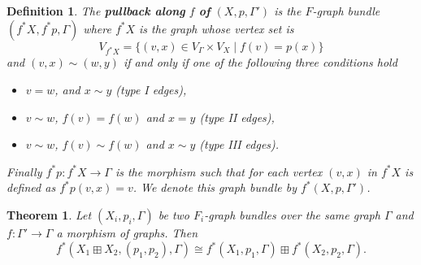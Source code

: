 \documentclass[10pt,a4paper]{amsart}
\newtheorem{defn}{Definition}
\newtheorem{thm}{Theorem}
\begin{document}
\begin{defn}\label{pullback}
The \textbf{pullback along } $f$ \textbf{of } $(X, p, \Gamma')$ is the $F$-graph bundle $(f^*X, f^*p, \Gamma)$ where $f^*X$ is the graph whose vertex set is 
\begin{equation*}
    V_{f^* X} = \{(v, x) \in V_{\Gamma} \times V_{X} \mid f(v) = p(x)\}
\end{equation*}
and $(v,x) \sim (w, y)$ if and only if one of the following three conditions hold
\begin{itemize}
    \item[\rm (1).] $v = w$, and $x\sim y$ (type I edges),
    \item[\rm (2).] $v\sim w$, $f(v) = f(w)$ and $x = y$ (type II edges),
    \item[\rm (3).] $v\sim w$, $f(v) \sim f(w)$ and $x \sim y$ (type III edges).
\end{itemize}
Finally $f^*p: f^*X \longrightarrow \Gamma$ is the morphism such that for each vertex $(v,x)$ in $f^*X$ is defined as $f^*p(v,x) = v$. We denote this graph bundle by $f^*(X, p, \Gamma')$.
\end{defn}

\begin{thm}\label{sumstab}
Let $(X_i, p_i, \Gamma)$ be two $F_i$-graph bundles over the same graph $\Gamma$ and  $f: \Gamma' \longrightarrow \Gamma$  a morphism of graphs. Then
\begin{equation}
f^*(X_1 \boxplus X_2, (p_1,p_2), \Gamma) \cong f^*(X_1, p_1, \Gamma) \boxplus f^*(X_2, p_2, \Gamma).
\end{equation}
\end{thm}
\end{document}

